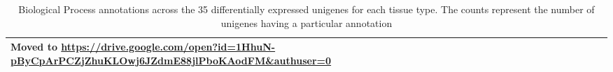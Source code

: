 \begin{table}[t]
\centering
\caption{Biological Process annotations across the 35 differentially expressed 
unigenes for each tissue type. The counts represent the number of unigenes 
having a particular annotation}

\begin{tabular}{lll}
\toprule
    Moved to \scriptsize{\url{https://drive.google.com/open?id=1HhuN-pByCpArPCZjZhuKLOwj6JZdmE88jlPboKAodFM&authuser=0}} \\
\bottomrule
\end{tabular}
\label{tab:dge_bp}
\end{table}
